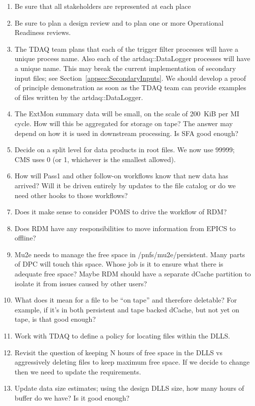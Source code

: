 \begin{enumerate}
\item Be sure that all stakeholders are represented at each place
  \item Be sure to plan a design review and to plan one or more Operational Readiness reviews.
\item The TDAQ team plans that each of the trigger filter processes will have a unique process name.
  Also each of the {\code artdaq::DataLogger} processes will have a unique name.
  This may break the current \art implementation of secondary input files; see Section~\ref{appsec:SecondaryInputs}.
  We should develop a proof of principle demonstration as soon as the TDAQ team can provide examples of files written by
  the  {\code artdaq::DataLogger}.
\item The ExtMon summary data will be small, on the scale of 200~KiB per MI cycle.  How will this be aggregated for storage on tape?
  The answer may depend on how it is used in downstream processing.  Is SFA good enough?
\item Decide on a split level for data products in \art root files.  We now use 99999; CMS uses 0 (or 1, whichever is the smallest allowed).
\item How will Pass1 and other follow-on workflows know that new data has arrived?
  Will it be driven entirely by updates to the file catalog or do we need other
  hooks to those workflows?
\item Does it make sense to consider POMS to drive the workflow of RDM?
\item Does RDM have any responsibilities to move information from EPICS to offline?
\item Mu2e needs to manage the free space in /pnfs/mu2e/persistent. Many parts of DPC will touch this space.
  Whose job is it to ensure what there is adequate free space? Maybe RDM should have a separate dCache
  partition to isolate it from issues caused by other users?
\item What does it mean for a file to be ``on tape'' and therefore deletable?
  For example, if it's in both persistent and tape backed dCache, but not yet on tape, is that good enough?
\item Work with TDAQ to define a policy for locating files within the DLLS.
\item Revisit the question of keeping N hours of free space in the DLLS vs aggressively deleting files to keep
  maximum free space.  If we decide to change then we need to update the requirements.
\item Update data size estimates; using the design DLLS size, how many hours of buffer do we have?  Is it good enough?

\end{enumerate}

